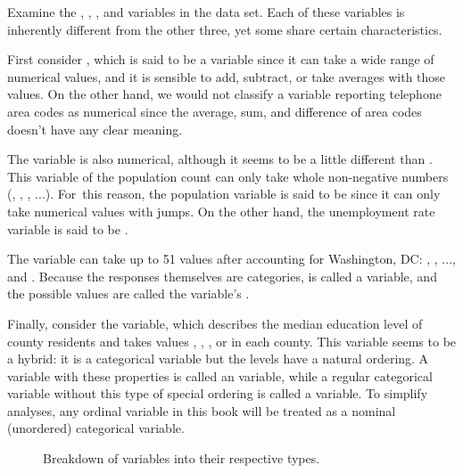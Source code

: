 Examine the , , ,
and  variables in the 
data set. Each of these variables is inherently different from the
other three, yet some share certain characteristics.

First consider ,
which is said to be a  variable since
it can take a wide range of numerical values,
and it is sensible to add, subtract, or take averages
with those values.
On the other hand, we would not classify a variable
reporting telephone area codes as numerical since the
average, sum, and difference of area codes doesn't have
any clear meaning.

The  variable is also numerical, although it seems
to be a little different than .
This variable of the population count can only take whole
non-negative numbers (, , , ...).
For~this reason, the population variable is said to be
 since it can only take numerical values
with jumps.
On the other hand, the unemployment rate variable is said
to be .

The variable  can take up to 51 values after
accounting for Washington, DC: , , ...,
and .
Because the responses themselves are categories,
 is called a  variable,
and the possible values are called the variable's .

Finally, consider the  variable,
which describes the median education level of county
residents and takes values
, ,
, or 
in each county.
This variable seems to be a hybrid: it is a categorical variable
but the levels have a natural ordering.
A variable with these properties is called an 
variable, while a regular categorical variable without this
type of special ordering is called a  variable.
To simplify analyses, any ordinal variable in this book will
be treated as a nominal (unordered) categorical variable.

\begin{figure}[h]
  \centering
  \caption{Breakdown of variables into their respective types.}
  \label{variables}
\end{figure}

